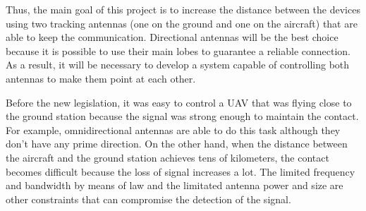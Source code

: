 Thus, the main goal of this project is to increase the distance between the devices using two tracking antennas (one on the ground and one on the aircraft) that are able to keep the communication. Directional antennas will be the best choice because it is possible to use their main lobes to guarantee a reliable connection. As a result, it will be necessary to develop a system capable of controlling both antennas to make them point at each other.



Before the new legislation, it was easy to control a UAV that was flying close to the ground station because the signal was strong enough to maintain the contact. For example, omnidirectional antennas are able to do this task although they don't have any prime direction. On the other hand, when the distance between the aircraft and the ground station achieves tens of kilometers, the contact becomes difficult because the loss of signal increases a lot. The limited frequency and bandwidth by means of law and the limitated antenna power and size are other constraints that can compromise the detection of the signal. 


